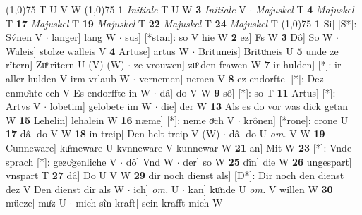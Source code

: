 \documentclass[8pt,a4paper,notitlepage]{article}
\begin{document}
\begin{table}[ht]
\begin{minipage}[t]{0.5\linewidth}
\begin{tabular}{rl}
\end{tabular}
\scriptsize
\line(1,0){75} \newline
T U V W \newline
\line(1,0){75} \newline
\textbf{1} \textit{Initiale} T U W  \textbf{3} \textit{Initiale} V   $\cdot$ \textit{Majuskel} T  \textbf{4} \textit{Majuskel} T  \textbf{17} \textit{Majuskel} T  \textbf{19} \textit{Majuskel} T  \textbf{22} \textit{Majuskel} T  \textbf{24} \textit{Majuskel} T  \newline
\line(1,0){75} \newline
\textbf{1} Si] [S*]: Sv́nen V  $\cdot$ langer] lang W  $\cdot$ sus] [*stan]: so V hie W \textbf{2} ez] Fs W \textbf{3} Dô] So W  $\cdot$ Waleis] stolze walleis V \textbf{4} Artuse] artus W  $\cdot$ Brituneis] Brituͦneis U \textbf{5} unde ze rîtern] Zuͦ ritern U (V) (W)  $\cdot$ ze vrouwen] zuͦ den frawen W \textbf{7} ir hulden] [*]: ir aller hulden V irm vrlaub W  $\cdot$ vernemen] nemen V \textbf{8} ez endorfte] [*]: Dez enmoͤhte ech V Es endorffte in W  $\cdot$ dâ] do V W \textbf{9} sô] [*]: so T \textbf{11} Artus] [*]: Artvs V  $\cdot$ lobetim] gelobete im W  $\cdot$ die] der W \textbf{13} Als es do vor was dick getan W \textbf{15} Lehelin] lehalein W \textbf{16} næme] [*]: neme oͮch V  $\cdot$ krônen] [*rone]: crone U \textbf{17} dâ] do V W \textbf{18} in treip] Den helt treip V (W)  $\cdot$ dâ] do U \textit{om.} V W \textbf{19} Cunneware] kuͦmeware U kvnneware V kunnewar W \textbf{21} an] Mit W \textbf{23} [*]: Vnde sprach [*]: gezoͤgenliche V  $\cdot$ dô] Vnd W  $\cdot$ der] so W \textbf{25} dîn] die W \textbf{26} ungespart] vnspart T \textbf{27} dâ] Do U V W \textbf{29} dir noch dienst als] [D*]: Dir noch den dienst dez V Den dienst dir als W  $\cdot$ ich] \textit{om.} U  $\cdot$ kan] kuͦnde U \textit{om.} V willen W \textbf{30} müeze] muͦz U  $\cdot$ mich sîn kraft] sein krafft mich W \newline
\end{minipage}
\end{table}
\end{document}
